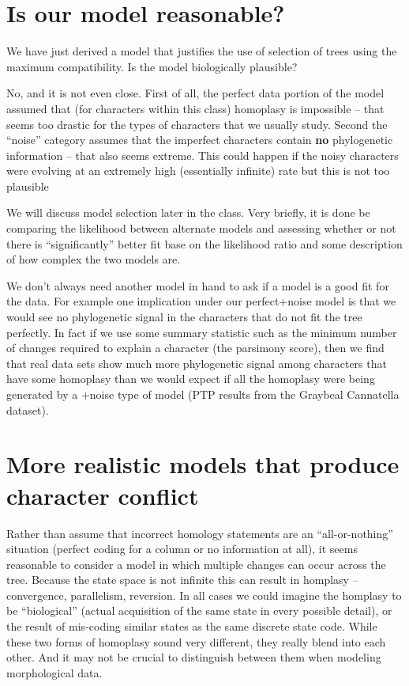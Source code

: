 \documentclass[11pt]{article}
\begin{document}
\section*{Is our model reasonable?}
We have just derived a model that justifies the use of selection of trees using the maximum compatibility.
Is the model biologically plausible?

No, and it is not even close.  
First of all, the perfect data portion of the model assumed that (for characters within this class) 
homoplasy is impossible -- that seems too drastic for the types of characters that we usually study.
Second the ``noise'' category assumes that the imperfect characters contain {\bf no} phylogenetic
information -- that also seems extreme. 
This could happen if the noisy characters were evolving at an extremely high (essentially infinite) rate
but this is not too plausible \citep[][provides a derivation of the connection between maximum compatibility and a mixture of low rate and high rate characters like the one presented above]{Felsenstein1981b}

We will discuss model selection later in the class. 
Very briefly, it is done be comparing the likelihood between alternate models and 
assessing whether or not there is ``significantly'' better fit base on the likelihood ratio
and some description of how complex the two models are.

We don't always need another model in hand to ask if a model is a good fit for the data.
For example one implication under our perfect+noise model is that we would see no phylogenetic
signal in the characters that do not fit the tree perfectly.
In fact if we use some summary statistic such as the minimum number of changes required to explain a 
character (the parsimony score), then we find that real data sets show much more 
phylogenetic signal among characters that have some homoplasy than we would expect if all
the homoplasy were being generated by a +noise type of model (PTP results from the Graybeal Cannatella dataset).

\section*{More realistic models that produce character conflict}
Rather than assume that incorrect homology statements are an ``all-or-nothing'' 
situation (perfect coding for a column or no information at all), it seems reasonable
to consider a model in which multiple changes can occur across the tree. 
Because the state space is not infinite this can result in homplasy -- convergence, parallelism,
reversion.  
In all cases we could imagine the homplasy to be ``biological'' (actual acquisition of the same
state in every possible detail), or the result of mis-coding similar states as the same discrete 
state code. 
While these two forms of homoplasy sound very different, they really blend into each other.
And it may not be crucial to distinguish between them when modeling morphological data.
\end{document}
